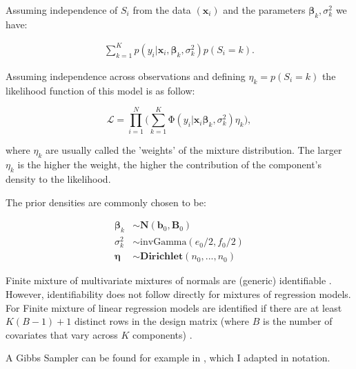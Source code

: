 \documentclass[11pt,a4paper]{article}
\begin{document}
Assuming independence of $S_i$ from the data $(\mathbf{x}_i)$ and the parameters $\bm{\beta}_k, \sigma^2_k$ we have:

\begin{equation*}
\begin{split}
\sum_{k=1}^K p(y_i | \mathbf{x}_i, \bm{\beta}_k, \sigma^2_k) p(S_i=k). 
\end{split}
\end{equation*}


Assuming independence across observations and defining $\eta_k=p(S_i=k)$ the likelihood function of this model is as follow: 

\begin{equation*}
\mathcal{L} = \prod^{N}_{i=1} \bigg ( \sum_{k=1}^{K} \mathrm{\Phi} ( y_{i} | \mathbf{x}_i\boldsymbol{\beta}_k, \sigma^2_k ) \eta_k \bigg ), 
\end{equation*}

where $\eta_k$ are usually called the 'weights' of the mixture distribution. The larger $\eta_k$ is the higher the weight, the higher the contribution of the component's density to the likelihood. 

The prior densities are commonly chosen to be: 


\begin{equation*}
\begin{split}
\boldsymbol{\beta}_k &\sim \mathrm{\mathbf{N}}(\textbf{b}_0, \textbf{B}_0) \\
\sigma^2_k &\sim \mathrm{invGamma}(e_0/2, f_0/2) \\
\bm{\eta} &\sim \mathrm{\mathbf{Dirichlet}}(n_0, ..., n_0)
\end{split}
\end{equation*}

Finite mixture of multivariate mixtures of normals are (generic) identifiable \citep[21 and references therein]{FruehwirthSchnatter.2006}. However, identifiability does not follow directly for mixtures of regression models. For  Finite mixture of linear regression models are identified if there are at least $K(B-1)+1$ distinct rows in the design matrix (where $B$ is the number of covariates that vary across $K$ components) \citep[246]{FruehwirthSchnatter.2006}. 


A Gibbs Sampler can be found for example in \citep[p. 75, 253]{FruehwirthSchnatter.2006}, which I adapted in notation. 
\end{document}
